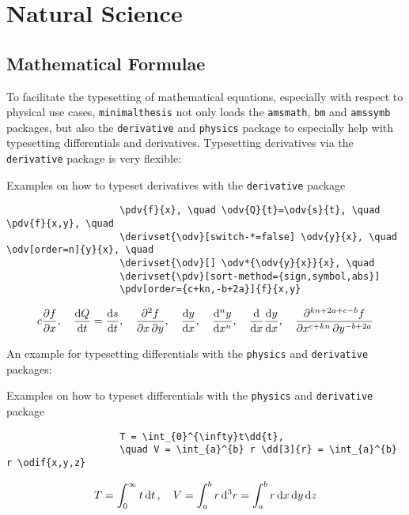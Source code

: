 \documentclass{./class/minimalthesis}
\begin{document}
		
		\newpage
		\label{page:example:header-with-chapter}
		\blindtext[4]
	
	\chapter{Natural Science}
		\section{Mathematical Formulae}
			To facilitate the typesetting of mathematical equations, especially with respect to physical use cases, \verb|minimalthesis| not only loads the \verb|amsmath|, \verb|bm| and \verb|amssymb| packages, but also the \verb|derivative| and \verb|physics| package to especially help with typesetting differentials and derivatives.
			\newline Typesetting derivatives via the \verb|derivative| package is very flexible: 
			\begin{table}[h!]
				\centering
				\caption{Examples on how to typeset derivatives with the \texttt{derivative} package}
				\begin{verbatim}
					\pdv{f}{x}, \quad \odv{Q}{t}=\odv{s}{t}, \quad \pdv{f}{x,y}, \quad 
					\derivset{\odv}[switch-*=false] \odv{y}{x}, \quad \odv[order=n]{y}{x}, \quad
					\derivset{\odv}[] \odv*{\odv{y}{x}}{x}, \quad 
					\derivset{\pdv}[sort-method={sign,symbol,abs}] 
					\pdv[order={c+kn,-b+2a}]{f}{x,y}
				\end{verbatim}
				\begin{align*}{c}
					\pdv{f}{x}, \quad \odv{Q}{t}=\odv{s}{t}, \quad \pdv{f}{x,y}, \quad 
					\derivset{\odv}[switch-*=false] \odv{y}{x}, \quad \odv[order=n]{y}{x}, \quad
					\derivset{\odv}[] \odv*{\odv{y}{x}}{x}, \quad 
					\derivset{\pdv}[sort-method={sign,symbol,abs}] \pdv[order={c+kn,-b+2a}]{f}{x,y}
				\end{align*}
			\end{table}
			An example for typesetting differentials with the \verb|physics| and \verb|derivative| packages:
			\begin{table}[h!]
				\centering
				\caption{Examples on how to typeset differentials with the \texttt{physics} and \texttt{derivative} package}
				\begin{verbatim}
					T = \int_{0}^{\infty}t\dd{t}, 
					\quad V = \int_{a}^{b} r \dd[3]{r} = \int_{a}^{b} r \odif{x,y,z}
				\end{verbatim}
				\begin{align*}
					T = \int_{0}^{\infty}t\dd{t}, \quad V = \int_{a}^{b} r \dd[3]{r} = \int_{a}^{b} r \odif{x,y,z}
				\end{align*}
				
			\end{table}
		
\end{document}
